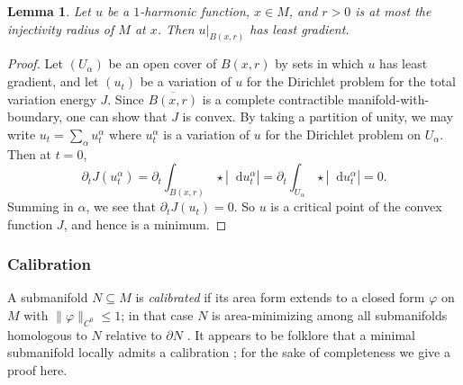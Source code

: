 \documentclass[reqno,11pt]{amsart}
\newcommand*\dif{\mathop{}\!\mathrm{d}}
\newcommand{\dfn}[1]{\emph{#1}\index{#1}}
\newtheorem{lemma}[theorem]{Lemma}
\theoremstyle{definition}
\numberwithin{equation}{section}
\begin{document}
\begin{lemma} \label{LLG implies LG}
Let $u$ be a $1$-harmonic function, $x \in M$, and $r > 0$ is at most the injectivity radius of $M$ at $x$.
Then $u|_{B(x, r)}$ has least gradient.
\end{lemma}
\begin{proof}
Let $(U_\alpha)$ be an open cover of $B(x, r)$ by sets in which $u$ has least gradient, and let $(u_t)$ be a variation of $u$ for the Dirichlet problem for the total variation energy $J$.
Since $\overline{B(x, r)}$ is a complete contractible manifold-with-boundary, one can show that $J$ is convex.
By taking a partition of unity, we may write $u_t = \sum_\alpha u_t^\alpha$ where $u_t^\alpha$ is a variation of $u$ for the Dirichlet problem on $U_\alpha$.
Then at $t = 0$,
$$\partial_t J(u_t^\alpha) = \partial_t \int_{B(x, r)} \star |\dif u_t^\alpha| = \partial_t \int_{U_\alpha} \star |\dif u_t^\alpha| = 0.$$
Summing in $\alpha$, we see that $\partial_t J(u_t) = 0$.
So $u$ is a critical point of the convex function $J$, and hence is a minimum.
\end{proof}

\subsubsection{Calibration}
A submanifold $N \subseteq M$ is \dfn{calibrated} if its area form extends to a closed form $\varphi$ on $M$ with $\|\varphi\|_{C^0} \leq 1$; in that case $N$ is area-minimizing among all submanifolds homologous to $N$ relative to $\partial N$ \cite{Harvey82}.
It appears to be folklore that a minimal submanifold locally admits a calibration \cite{Bryant17}; for the sake of completeness we give a proof here.
\end{document}
